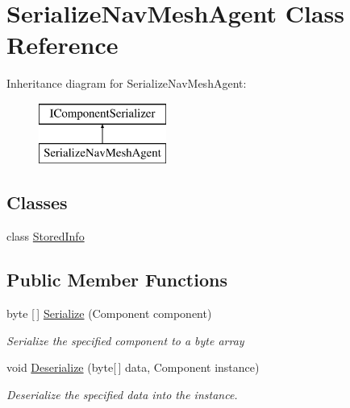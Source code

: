 \hypertarget{class_serialize_nav_mesh_agent}{}\section{Serialize\+Nav\+Mesh\+Agent Class Reference}
\label{class_serialize_nav_mesh_agent}
Inheritance diagram for Serialize\+Nav\+Mesh\+Agent\+:\begin{figure}[H]
\begin{center}
\leavevmode
\includegraphics[height=2.000000cm]{class_serialize_nav_mesh_agent}
\end{center}
\end{figure}
\subsection*{Classes}
\begin{DoxyCompactItemize}
\item 
class \hyperlink{class_serialize_nav_mesh_agent_1_1_stored_info}{Stored\+Info}
\end{DoxyCompactItemize}
\subsection*{Public Member Functions}
\begin{DoxyCompactItemize}
\item 
byte \mbox{[}$\,$\mbox{]} \hyperlink{class_serialize_nav_mesh_agent_a74cea446ba02a0814a3c215c27fa81d8}{Serialize} (Component component)
\begin{DoxyCompactList}\small\item\em Serialize the specified component to a byte array \end{DoxyCompactList}\item 
void \hyperlink{class_serialize_nav_mesh_agent_ad5a28c80e751f4727a1a4b83c06b5428}{Deserialize} (byte\mbox{[}$\,$\mbox{]} data, Component instance)
\begin{DoxyCompactList}\small\item\em Deserialize the specified data into the instance. \end{DoxyCompactList}\end{DoxyCompactItemize}


